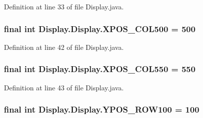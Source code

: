 Definition at line 33 of file Display.\+java.

\hypertarget{class_display_1_1_display_a8fafcc6bf1485ea9d420d3ec725472a7}{}
\subsubsection[{X\+P\+O\+S\+\_\+\+C\+O\+L500}]{\setlength{\rightskip}{0pt plus 5cm}final int Display.\+Display.\+X\+P\+O\+S\+\_\+\+C\+O\+L500 = 500\hspace{0.3cm}{\ttfamily [static]}}\label{class_display_1_1_display_a8fafcc6bf1485ea9d420d3ec725472a7}


Definition at line 42 of file Display.\+java.

\hypertarget{class_display_1_1_display_a50de34dab11aef2aa13d782d088deb7d}{}
\subsubsection[{X\+P\+O\+S\+\_\+\+C\+O\+L550}]{\setlength{\rightskip}{0pt plus 5cm}final int Display.\+Display.\+X\+P\+O\+S\+\_\+\+C\+O\+L550 = 550\hspace{0.3cm}{\ttfamily [static]}}\label{class_display_1_1_display_a50de34dab11aef2aa13d782d088deb7d}


Definition at line 43 of file Display.\+java.

\hypertarget{class_display_1_1_display_ab910e7da741fb624b211994905f5a1ec}{}
\subsubsection[{Y\+P\+O\+S\+\_\+\+R\+O\+W100}]{\setlength{\rightskip}{0pt plus 5cm}final int Display.\+Display.\+Y\+P\+O\+S\+\_\+\+R\+O\+W100 = 100\hspace{0.3cm}{\ttfamily [static]}}\label{class_display_1_1_display_ab910e7da741fb624b211994905f5a1ec}


